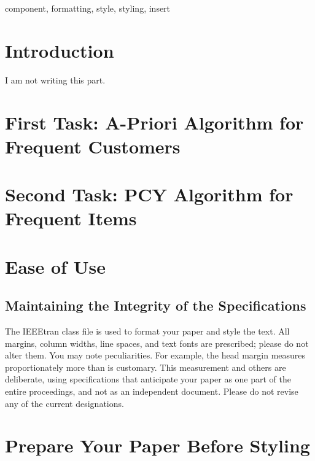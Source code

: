 \documentclass[conference]{IEEEtran}
\begin{document}
    \begin{IEEEkeywords}
        component, formatting, style, styling, insert
    \end{IEEEkeywords}

    \section{Introduction}
    \label{sec:introduction}

    I am not writing this part.

    \section{First Task: A-Priori Algorithm for Frequent Customers}
    \label{sec:first-task}
    

    \section{Second Task: PCY Algorithm for Frequent Items}
    \label{sec:second-task}
%    

    \section{Ease of Use}
    \label{sec:ease-of-use}

    \subsection{Maintaining the Integrity of the Specifications}
    \label{subsec:maintaining-the-integrity-of-the-specifications}

    The IEEEtran class file is used to format your paper and style the text.
    All margins, column widths, line spaces, and text fonts are prescribed; please do not alter them.
    You may note peculiarities.
    For example, the head margin measures proportionately more than is customary.
    This measurement and others are deliberate, using specifications that anticipate your paper as one part of the entire proceedings, and not as an independent document.
    Please do not revise any of the current designations.

    \section{Prepare Your Paper Before Styling}
    \label{sec:prepare-your-paper-before-styling}
%    
\end{document}
